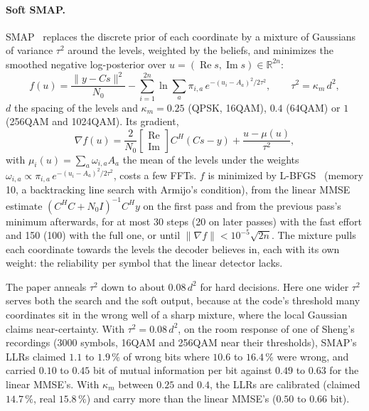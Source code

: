 \documentclass[11pt,a4paper]{article}
\theoremstyle{remark}
\begin{document}
\paragraph{Soft SMAP.}
SMAP~\cite{smap} replaces the discrete prior of each coordinate by a mixture of Gaussians of variance $\tau^2$ around the levels, weighted by the beliefs, and minimizes the smoothed negative log-posterior over $u = (\operatorname{Re} s, \operatorname{Im} s) \in \mathbb R^{2n}$:
\begin{equation}
f(u) = \frac{\|y - C s\|^2}{N_0} - \sum_{i=1}^{2n} \ln \sum_a \pi_{i,a}\, e^{-(u_i - A_a)^2/2\tau^2}, \qquad \tau^2 = \kappa_m\, d^2,
\label{eq:smap}
\end{equation}
$d$ the spacing of the levels and $\kappa_m = 0.25$ (QPSK, 16QAM), $0.4$ (64QAM) or $1$ (256QAM and 1024QAM). Its gradient,
\begin{equation}
\nabla f(u) = \frac{2}{N_0} \begin{bmatrix} \operatorname{Re} \\ \operatorname{Im} \end{bmatrix} C^H (C s - y) + \frac{u - \mu(u)}{\tau^2},
\end{equation}
with $\mu_i(u) = \sum_a \omega_{i,a} A_a$ the mean of the levels under the weights $\omega_{i,a} \propto \pi_{i,a}\, e^{-(u_i - A_a)^2/2\tau^2}$, costs a few FFTs. $f$ is minimized by L-BFGS~\cite{lbfgs} (memory 10, a backtracking line search with Armijo's condition), from the linear MMSE estimate $(C^H C + N_0 I)^{-1} C^H y$ on the first pass and from the previous pass's minimum afterwards, for at most 30 steps (20 on later passes) with the fast effort and 150 (100) with the full one, or until $\|\nabla f\| < 10^{-5}\sqrt{2n}$. The mixture pulls each coordinate towards the levels the decoder believes in, each with its own weight: the reliability per symbol that the linear detector lacks.

The paper anneals $\tau^2$ down to about $0.08\,d^2$ for hard decisions. Here one wider $\tau^2$ serves both the search and the soft output, because at the code's threshold many coordinates sit in the wrong well of a sharp mixture, where the local Gaussian claims near-certainty. With $\tau^2 = 0.08\,d^2$, on the room response of one of Sheng's recordings (3000 symbols, 16QAM and 256QAM near their thresholds), SMAP's LLRs claimed $1.1$ to $1.9\,\%$ of wrong bits where $10.6$ to $16.4\,\%$ were wrong, and carried $0.10$ to $0.45$ bit of mutual information per bit against $0.49$ to $0.63$ for the linear MMSE's. With $\kappa_m$ between $0.25$ and $0.4$, the LLRs are calibrated (claimed $14.7\,\%$, real $15.8\,\%$) and carry more than the linear MMSE's ($0.50$ to $0.66$ bit).
\end{document}
